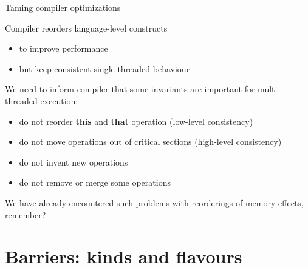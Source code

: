 \begin{frame}[t, fragile]{Taming compiler optimizations}

Compiler reorders language-level constructs
\begin{itemize}
  \pause
  \item to improve performance
  \pause
  \item but keep consistent single-threaded behaviour 
\end{itemize}

\pause
We need to inform compiler that some invariants are important for multi-threaded execution:
\begin{itemize}
  \pause \item do not reorder \textbf{this} and \textbf{that} operation (low-level consistency)
  \pause \item do not move operations out of critical sections (high-level consistency)
  \pause \item do not invent new operations
  \pause \item do not remove or merge some operations
\end{itemize}

\pause

We have already encountered such problems with reorderings of memory effects, remember?

\end{frame}

% 
% 

\section{Barriers: kinds and flavours}
\showTOC

